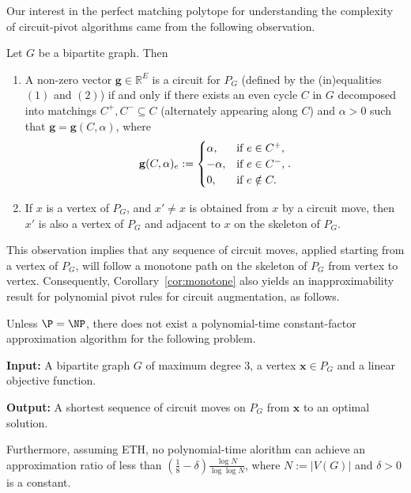 \documentclass[runningheads]{llncs}
\begin{document}
Our interest in the perfect matching polytope for understanding the complexity of circuit-pivot algorithms came from the following observation. 

\begin{lemma}\label{lemma:circuits}
Let $G$ be a bipartite graph. Then 
\begin{enumerate}
    \item A non-zero vector $\mathbf{g} \in \mathbb{R}^E$ is a circuit for $P_G$ (defined by the (in)equalities $(1)$ and $(2)$) if and only if there exists an even cycle $C$ in $G$ decomposed into matchings $C^+, C^- \subseteq C$ (alternately appearing along $C$) and $\alpha>0$ such that $\mathbf{g}=\mathbf{g}(C,\alpha)$, where $$\mathbf{g}(C,\alpha)_e:=\begin{cases} \alpha, & \text{if }e \in C^+, \cr -\alpha, & \text{if }e \in C^-, \cr 0, & \text{if }e\notin C. \end{cases}.$$
    \item If $x$ is a vertex of $P_G$, and $x'\neq x$ is obtained from $x$ by a circuit move, then $x'$ is also a vertex of $P_G$ and adjacent to $x$ on the skeleton of $P_G$. 
\end{enumerate}
\end{lemma}

This observation implies that any sequence of circuit moves, applied starting from a vertex of $P_G$, will follow a monotone path on the skeleton of $P_G$ from vertex to vertex. Consequently, Corollary~\ref{cor:monotone} also yields an inapproximability result for polynomial pivot rules for circuit augmentation, as follows. 
\begin{corollary}\label{cor:circuitdistanceisalsohard}
  Unless $\P=\NP$, there does not exist a polynomial-time constant-factor approximation algorithm for the following problem. 
\begin{description}
\item{\textbf{Input:}} A bipartite graph $G$ of maximum degree $3$, a vertex $\mathbf{x} \in P_G$ and a linear objective function. 
\item{\textbf{Output:}} A shortest sequence of circuit moves on $P_G$ from $\mathbf{x}$ to an optimal solution. 
\end{description}
Furthermore, assuming ETH, no polynomial-time alorithm can achieve an approximation ratio of less than $\left(\frac{1}{8}-\delta\right)\frac{\log N}{\log \log N}$, where $N:=|V(G)|$ and $\delta>0$ is a constant.
\end{corollary}
\end{document}
